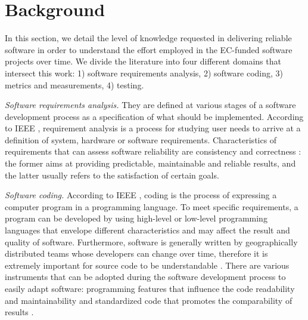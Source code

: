 %
%


\section{Background}
\label{sec:b}

In this section, we detail the level of knowledge requested in delivering reliable software in order
to understand the effort employed in the EC-funded software projects over time. We divide the literature
into four different domains that intersect this work: 1) software requirements analysis, 2) software
coding,
3) metrics and measurements, 4) testing.

\emph{Software requirements analysis.} They are defined at various stages of a software development process
as a specification of what should be implemented. According to IEEE \cite{radatz}, requirement
analysis is a process for studying user needs to arrive at a definition of system, hardware or software
requirements. Characteristics of requirements that can assess software reliability are consistency and
correctness \cite{sommerville}: the former aims at providing predictable, maintainable and reliable
results, and the latter usually refers to the satisfaction of certain goals.

\emph{Software coding.} According to IEEE \cite{radatz}, coding is the process of expressing a computer
program in a programming language. To meet specific requirements, a program can be developed by using
high-level or low-level programming languages that envelope different characteristics and may affect the
result and quality of software. Furthermore, software is generally written by geographically distributed
teams whose developers can change over time, therefore it is extremely important for source code to be
understandable \cite{tashtoush}. There are various instruments that can be adopted during the software
development process to easily adapt software: programming features that influence the
code readability and maintainability \cite{buse} and standardized code that promotes the comparability of results \cite{baggen}.

